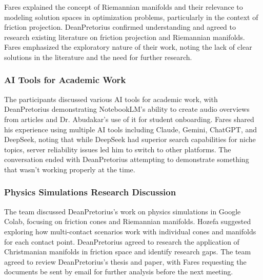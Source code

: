 Fares explained the concept of Riemannian manifolds and their relevance to modeling solution spaces in optimization problems, particularly in the context of friction projection. DeanPretorius confirmed understanding and agreed to research existing literature on friction projection and Riemannian manifolds. Fares emphasized the exploratory nature of their work, noting the lack of clear solutions in the literature and the need for further research.

\subsubsection{AI Tools for Academic Work}

The participants discussed various AI tools for academic work, with DeanPretorius demonstrating NotebookLM's ability to create audio overviews from articles and Dr. Abudakar's use of it for student onboarding. Fares shared his experience using multiple AI tools including Claude, Gemini, ChatGPT, and DeepSeek, noting that while DeepSeek had superior search capabilities for niche topics, server reliability issues led him to switch to other platforms. The conversation ended with DeanPretorius attempting to demonstrate something that wasn't working properly at the time.

\subsubsection{Physics Simulations Research Discussion}

The team discussed DeanPretorius's work on physics simulations in Google Colab, focusing on friction cones and Riemannian manifolds. Hozefa suggested exploring how multi-contact scenarios work with individual cones and manifolds for each contact point. DeanPretorius agreed to research the application of Christmanian manifolds in friction space and identify research gaps. The team agreed to review DeanPretorius's thesis and paper, with Fares requesting the documents be sent by email for further analysis before the next meeting.

 
 